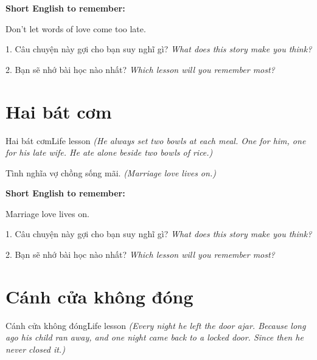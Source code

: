 \begin{ghinhoanh}
\textbf{Short English to remember:}

Don't let words of love come too late.

\end{ghinhoanh}

\begin{tuhocnhanh}
1. Câu chuyện này gợi cho bạn suy nghĩ gì? \textit{What does this story make you think?}

2. Bạn sẽ nhớ bài học nào nhất? \textit{Which lesson will you remember most?}
\end{tuhocnhanh}
\ngancach


\section{Hai bát cơm}
\begin{truyen}{Hai bát cơm}{Life lesson}
\textit{(He always set two bowls at each meal. One for him, one for his late wife. He ate alone beside two bowls of rice.)}
\end{truyen}

\begin{baihoc}
Tình nghĩa vợ chồng sống mãi.
\textit{(Marriage love lives on.)}
\end{baihoc}

\begin{ghinhoanh}
\textbf{Short English to remember:}

Marriage love lives on.

\end{ghinhoanh}

\begin{tuhocnhanh}
1. Câu chuyện này gợi cho bạn suy nghĩ gì? \textit{What does this story make you think?}

2. Bạn sẽ nhớ bài học nào nhất? \textit{Which lesson will you remember most?}
\end{tuhocnhanh}
\ngancach


\section{Cánh cửa không đóng}
\begin{truyen}{Cánh cửa không đóng}{Life lesson}
\textit{(Every night he left the door ajar. Because long ago his child ran away, and one night came back to a locked door. Since then he never closed it.)}
\end{truyen}

